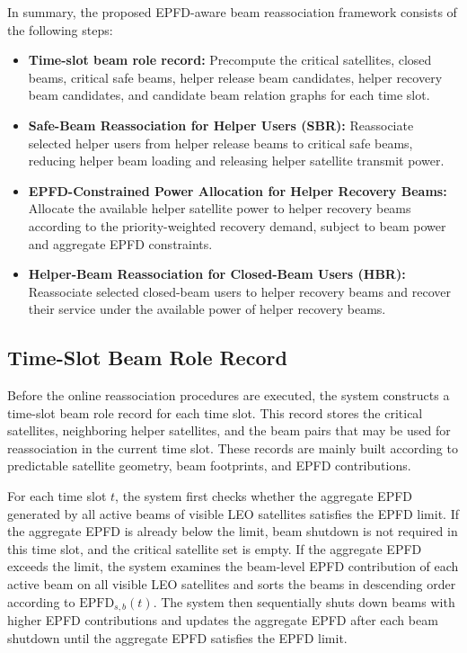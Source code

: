 In summary, the proposed EPFD-aware beam reassociation framework consists of the following steps:
\begin{itemize}[leftmargin=*,nosep]
  \item \textbf{Time-slot beam role record:} Precompute the critical satellites, closed beams, critical safe beams, helper release beam candidates, helper recovery beam candidates, and candidate beam relation graphs for each time slot.
  \item \textbf{Safe-Beam Reassociation for Helper Users (SBR):} Reassociate selected helper users from helper release beams to critical safe beams, reducing helper beam loading and releasing helper satellite transmit power.
  \item \textbf{EPFD-Constrained Power Allocation for Helper Recovery Beams:} Allocate the available helper satellite power to helper recovery beams according to the priority-weighted recovery demand, subject to beam power and aggregate EPFD constraints.
  \item \textbf{Helper-Beam Reassociation for Closed-Beam Users (HBR):} Reassociate selected closed-beam users to helper recovery beams and recover their service under the available power of helper recovery beams.
\end{itemize}

\subsection{Time-Slot Beam Role Record}

Before the online reassociation procedures are executed, the system constructs a time-slot beam role record for each time slot. This record stores the critical satellites, neighboring helper satellites, and the beam pairs that may be used for reassociation in the current time slot. These records are mainly built according to predictable satellite geometry, beam footprints, and EPFD contributions.

For each time slot $t$, the system first checks whether the aggregate EPFD generated by all active beams of visible LEO satellites satisfies the EPFD limit. If the aggregate EPFD is already below the limit, beam shutdown is not required in this time slot, and the critical satellite set is empty. If the aggregate EPFD exceeds the limit, the system examines the beam-level EPFD contribution of each active beam on all visible LEO satellites and sorts the beams in descending order according to $\mathrm{EPFD}_{s,b}(t)$. The system then sequentially shuts down beams with higher EPFD contributions and updates the aggregate EPFD after each beam shutdown until the aggregate EPFD satisfies the EPFD limit.

